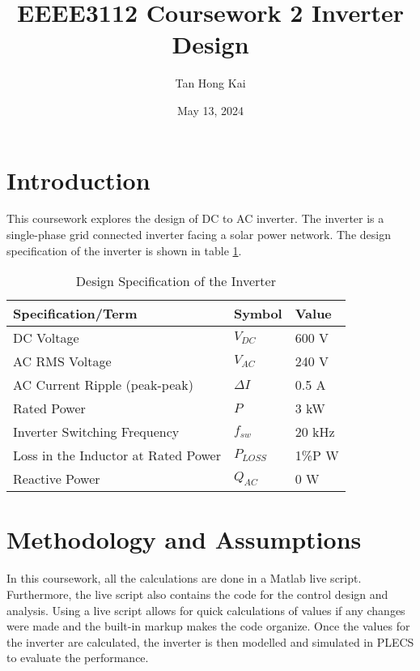 \documentclass[12pt]{article}
\title{EEEE3112 Coursework 2 Inverter Design}
\author{Tan Hong Kai}
\date{May 13, 2024}
\begin{document}
\maketitle

\section{Introduction}

This coursework explores the design of DC to AC inverter.
The inverter is a single-phase grid connected inverter facing a solar power network.
The design specification of the inverter is shown in table \ref{tab:design-spec}.

\begin{table}[H]
    \caption{Design Specification of the Inverter}
    \label{tab:design-spec}
    \centering{}
    \begin{tabular}{l l  l}
        \hline
        Specification/Term                  & Symbol      & Value  \\
        \hline
        DC Voltage                          & $V_{DC}$    & 600 V  \\
        AC RMS Voltage                      & $V_{AC}$    & 240 V  \\
        AC Current Ripple (peak-peak)       & $\Delta{I}$ & 0.5 A  \\
        Rated Power                         & $P$         & 3 kW   \\
        Inverter Switching Frequency        & $f_{sw}$    & 20 kHz \\
        Loss in the Inductor at Rated Power & $P_{LOSS}$  & 1\%P W \\
        Reactive Power                      & $Q_{AC}$    & 0 W    \\
        \hline
    \end{tabular}
\end{table}

\section{Methodology and Assumptions}

In this coursework, all the calculations are done in a Matlab live script.
Furthermore, the live script also contains the code for the control design and analysis.
Using a live script allows for quick calculations of values if any changes were made and the built-in markup makes the code organize.
Once the values for the inverter are calculated, the inverter is then modelled and simulated in PLECS to evaluate the performance.
\end{document}
